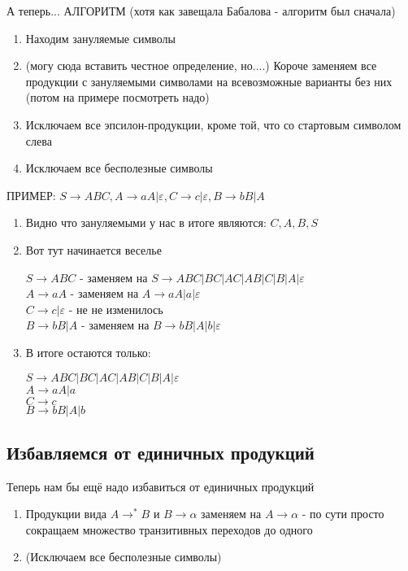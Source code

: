 \documentclass{article}
\begin{document}
А теперь... АЛГОРИТМ (хотя как завещала Бабалова - алгоритм был сначала)
\begin{enumerate}
  \item Находим зануляемые символы
    \item (могу сюда вставить честное определение, но....) Короче заменяем все продукции с зануляемыми символами на всевозможные варианты без них (потом на примере посмотреть надо)
    \item Исключаем все эпсилон-продукции, кроме той, что со стартовым символом слева
    \item Исключаем все бесполезные символы
\end{enumerate}


ПРИМЕР:
$S \to ABC, A \to aA| \varepsilon, C \to c | \varepsilon, B \to bB | A$
\begin{enumerate}
  \item Видно что зануляемыми у нас в итоге являются: $C, A, B, S$
    \item Вот тут начинается веселье

        $ S \to ABC $ - заменяем на $ S \to ABC | BC | AC | AB | C | B | A | \varepsilon $ \\
        $ A \to aA $ - заменяем на $ A \to aA|a|\varepsilon $ \\
        $ C \to c| \varepsilon $  - не не изменилось\\
        $ B \to bB|A $ - заменяем на $ B \to bB|A|b|\varepsilon $ \\
    \item В итоге остаются только:

        $ S \to ABC | BC | AC | AB | C | B | A | \varepsilon $ \\
        $ A \to aA|a $ \\
        $ C \to c $\\
        $ B \to bB|A|b $ \\
\end{enumerate}

\subsection{Избавляемся от единичных продукций}
Теперь нам бы ещё надо избавиться от единичных продукций
\begin{enumerate}
  \item Продукции вида $ A \to^* B$ и $B \to \alpha $ заменяем на $ A \to \alpha $ - по сути просто сокращаем множество транзитивных переходов до одного
    \item (Исключаем все бесполезные символы)
\end{enumerate}
\end{document}
